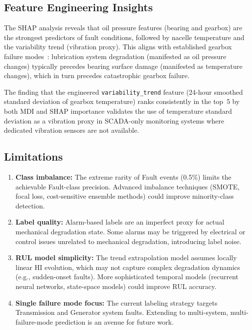 \documentclass[preprint,12pt]{elsarticle}
\begin{document}
\subsection{Feature Engineering Insights}

The SHAP analysis reveals that oil pressure features (bearing and gearbox) are the strongest predictors of fault conditions, followed by nacelle temperature and the variability trend (vibration proxy). This aligns with established gearbox failure modes~\cite{igba2015}: lubrication system degradation (manifested as oil pressure changes) typically precedes bearing surface damage (manifested as temperature changes), which in turn precedes catastrophic gearbox failure.

The finding that the engineered \texttt{variability\_trend} feature (24-hour smoothed standard deviation of gearbox temperature) ranks consistently in the top~5 by both MDI and SHAP importance validates the use of temperature standard deviation as a vibration proxy in SCADA-only monitoring systems where dedicated vibration sensors are not available.

\subsection{Limitations}

\begin{enumerate}
    \item \textbf{Class imbalance:} The extreme rarity of Fault events (0.5\%) limits the achievable Fault-class precision. Advanced imbalance techniques (SMOTE, focal loss, cost-sensitive ensemble methods) could improve minority-class detection.

    \item \textbf{Label quality:} Alarm-based labels are an imperfect proxy for actual mechanical degradation state. Some alarms may be triggered by electrical or control issues unrelated to mechanical degradation, introducing label noise.

    \item \textbf{RUL model simplicity:} The trend extrapolation model assumes locally linear HI evolution, which may not capture complex degradation dynamics (e.g., sudden-onset faults). More sophisticated temporal models (recurrent neural networks, state-space models) could improve RUL accuracy.

    \item \textbf{Single failure mode focus:} The current labeling strategy targets Transmission and Generator system faults. Extending to multi-system, multi-failure-mode prediction is an avenue for future work.
\end{enumerate}
\end{document}
